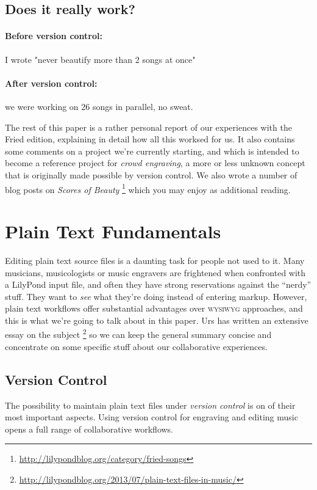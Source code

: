 \documentclass[11pt,a4paper]{article}
\begin{document}
\subsection{Does it really work?}

\paragraph{Before version control:}
I wrote "never beautify more than 2 songs at once"

\paragraph{After version control:}
we were working on 26 songs in parallel, no sweat.

\medskip
The rest of this paper is a rather personal report of our experiences with the Fried
edition, explaining in detail how all this worksed for us.  It also contains
some comments on a project we're currently starting, and which is intended to become
a reference project for \emph{crowd engraving}, a more or less unknown concept that is
originally made possible by version control. We also wrote a number of blog posts on
\emph{Scores of Beauty}%
\footnote{\url{http://lilypondblog.org/category/fried-songs}}
which you may enjoy as additional reading.

\section{Plain Text Fundamentals}
Editing plain text source files is a daunting task for people not used to it.
Many musicians, musicologists or music engravers are frightened when
confronted with a LilyPond input file, and often they have strong reservations
against the “nerdy” stuff. They want to \emph{see} what they're doing instead of entering
markup. However, plain text workflows offer substantial advantages over \textsc{wysiwyg}
approaches, and this is what we're going to talk about in this paper. Urs has written
an extensive essay on the subject%
\footnote{\url{http://lilypondblog.org/2013/07/plain-text-files-in-music/}}
so we can keep the general summary concise and concentrate on some specific stuff
about our collaborative experiences.

\subsection{Version Control}
The possibility to maintain plain text files under \emph{version control} is on of
their most important aspects. Using version control for engraving and editing music
opens a full range of collaborative workflows.
\end{document}
